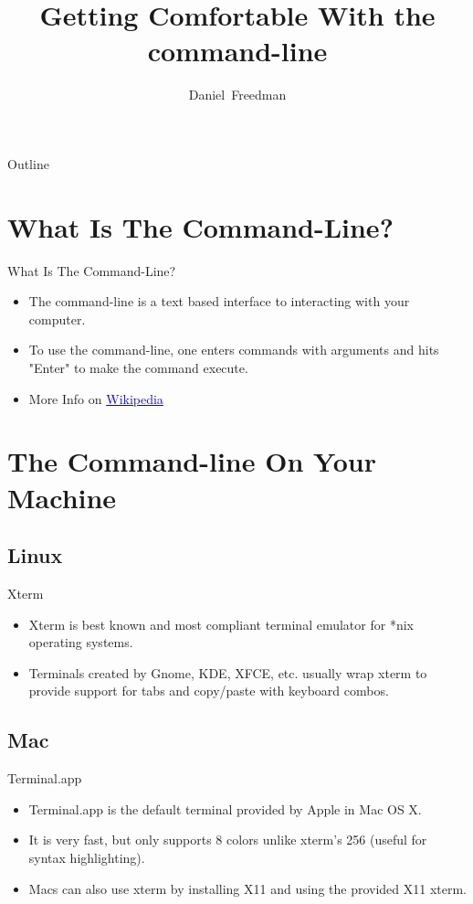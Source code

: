 \documentclass[10pt]{beamer}
\title[Getting Comfortable With the command-line]
{Getting Comfortable With the command-line}
\author[ACM Student Lecture Series]{Daniel~Freedman}
\date[September 14th, 2010]
\begin{document}
\begin{frame}
  \titlepage
\end{frame}

\begin{frame}{Outline}
  \tableofcontents
\end{frame}

\section{What Is The Command-Line?}
\begin{frame}{What Is The Command-Line?}
  \begin{itemize}[<+->]
  \item The command-line is a text based interface to interacting with your computer.
  \item To use the command-line, one enters commands with arguments and hits "Enter" to make the command execute.
  \item More Info on \href{http://en.wikipedia.org/wiki/Command-line\_interface}{\textcolor{blue}{Wikipedia}}
  \end{itemize}
\end{frame}

\section{The Command-line On Your Machine}

\subsection{Linux}
\begin{frame}{Xterm}
\begin{itemize}[<+->]
\item Xterm is best known and most compliant terminal emulator for *nix operating systems.
\item Terminals created by Gnome, KDE, XFCE, etc. usually wrap xterm to provide support for tabs and copy/paste with keyboard combos.
\end{itemize}
\end{frame}

\subsection{Mac}
\begin{frame}{Terminal.app}
\begin{itemize}[<+->]
\item Terminal.app is the default terminal provided by Apple in Mac OS X.
\item It is very fast, but only supports 8 colors unlike xterm's 256 (useful for syntax highlighting).
\item Macs can also use xterm by installing X11 and using the provided X11 xterm.
\end{itemize}
\end{frame}
\end{document}
